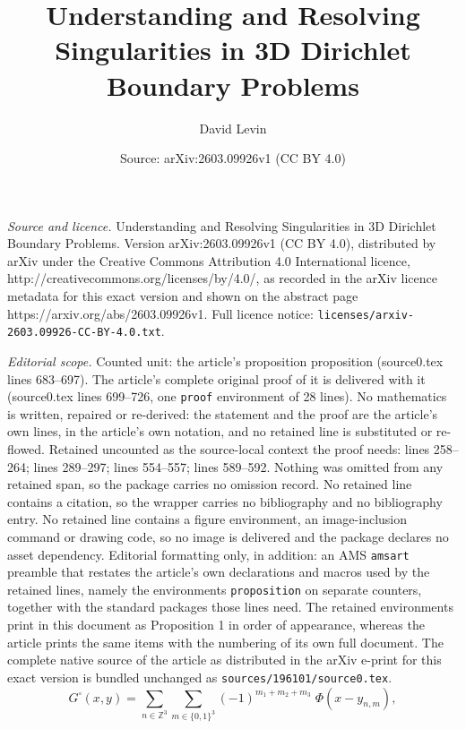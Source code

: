 \documentclass[10pt,a4paper]{amsart}
\title{Understanding and Resolving Singularities in 3D Dirichlet Boundary Problems}
\author{David Levin}
\date{Source: arXiv:2603.09926v1 (CC BY 4.0)}
\begin{document}
\maketitle

\noindent\emph{Source and licence.} Understanding and Resolving Singularities in 3D Dirichlet Boundary Problems. Version arXiv:2603.09926v1 (CC BY 4.0), distributed by arXiv under the Creative Commons Attribution 4.0 International licence, http://creativecommons.org/licenses/by/4.0/, as recorded in the arXiv licence metadata for this exact version and shown on the abstract page https://arxiv.org/abs/2603.09926v1. Full licence notice: \texttt{licenses/arxiv-2603.09926-CC-BY-4.0.txt}.\par\smallskip

\noindent\textit{Editorial scope.} Counted unit: the article's proposition proposition (source0.tex lines 683--697). The article's complete original proof of it is delivered with it (source0.tex lines 699--726, one \texttt{proof} environment of 28 lines). No mathematics is written, repaired or re-derived: the statement and the proof are the article's own lines, in the article's own notation, and no retained line is substituted or re-flowed.  Retained uncounted as the source-local context the proof needs: lines 258--264; lines 289--297; lines 554--557; lines 589--592.  Nothing was omitted from any retained span, so the package carries no omission record.  No retained line contains a citation, so the wrapper carries no bibliography and no bibliography entry.  No retained line contains a figure environment, an image-inclusion command or drawing code, so no image is delivered and the package declares no asset dependency.  Editorial formatting only, in addition: an AMS \texttt{amsart} preamble that restates the article's own declarations and macros used by the retained lines, namely the environments \texttt{proposition} on separate counters, together with the standard packages those lines need.  The retained environments print in this document as Proposition 1 in order of appearance, whereas the article prints the same items with the numbering of its own full document.  The complete native source of the article as distributed in the arXiv e-print for this exact version is bundled unchanged as \texttt{sources/196101/source0.tex}.
\begin{equation}\label{Gcube}
G^\square(x,y)
= \sum_{n\in\mathbb{Z}^3}
\sum_{m\in\{0,1\}^3}
(-1)^{m_1+m_2+m_3}\;
\Phi\!\left(x - y_{n,m}\right),
\end{equation}
\end{document}
